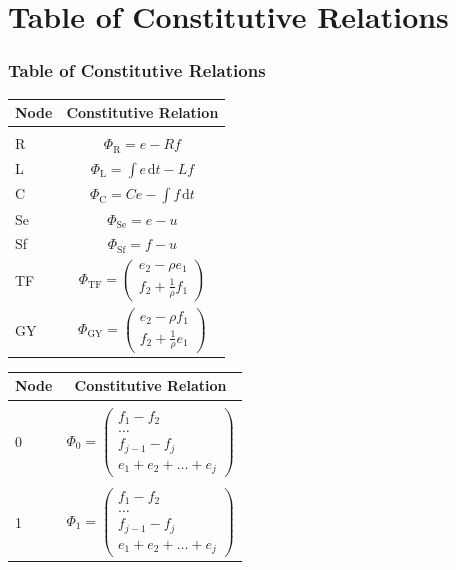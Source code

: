 \documentclass[11pt,reqno]{beamer}
\newcommand{\df}[1]{\mspace{2mu}  \mathrm{d}#1}
\begin{document}
\section{Table of Constitutive Relations}
\begin{frame}
\frametitle{Table of Constitutive Relations}
\begin{small}
\begin{minipage}[c][\textheight][t]{0.4\textwidth}
\vspace{0.75cm}
\begin{tabular}{| l | c |}
	Node & Constitutive Relation\\
	\hline
	& \\
	R & $\Phi_\text{R} = e -Rf$\\
	L & $\Phi_\text{L} = \int e\df{t} - Lf$\\
	C & $\Phi_\text{C} = Ce - \int f \df{t}$\\
	Se & $\Phi_\text{Se} = e - u$\\
	Sf & $\Phi_\text{Sf} = f - u$\\
	TF & $\Phi_\text{TF} =\left(\begin{matrix}
	e_2 - \rho e_1 \\
	f_2 +\frac{1}{\rho}f_1
	\end{matrix} \right)$\\
	GY & $\Phi_\text{GY} =\left(\begin{matrix}
	e_2 - \rho f_1 \\
	f_2 +\frac{1}{\rho}e_1
	\end{matrix} \right)$
\end{tabular}
\end{minipage}\hfill
\begin{minipage}[c][\textheight][t]{0.45\textwidth}
	\vspace{0.75cm}
\begin{tabular}{| l | c |}
	Node & Constitutive Relation\\
	\hline
	&\\
	0 &$	\Phi_\text{0} = \left(\begin{matrix}
	f_1 -f_2\\
	\ldots\\
	f_{j-1} - f_j\\
	e_1 + e_2 + \ldots + e_j 
	\end{matrix}\right)$\\
	&
	\\
	1&$	\Phi_\text{1} = \left(\begin{matrix}
	f_1 -f_2\\
	\ldots\\
	f_{j-1} - f_j\\
	e_1 + e_2 + \ldots + e_j 
	\end{matrix}\right)$
\end{tabular}
\end{minipage}
\end{small}
\end{frame}
\end{document}
